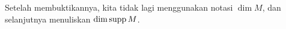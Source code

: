 Setelah membuktikannya, kita tidak lagi menggunakan notasi $\dim M$, dan selanjutnya menuliskan
$\mathrm{dim} \operatorname{supp} M$.

